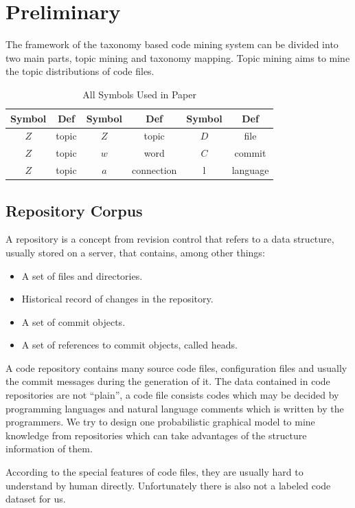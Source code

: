 \section{Preliminary}
\label{sec:framework}

The framework of the taxonomy based code mining system can be divided into two main
parts, topic mining and taxonomy mapping. Topic mining aims to mine the topic
distributions of code files.
\begin{table}[h]
\centering
\label{tab:anno}
\begin{tabular}{|c|c||c|c||c|c|}
\hline
Symbol & Def & Symbol & Def & Symbol & Def\\\hline \hline
$Z$ & topic & $Z$ & topic & $D$ & file \\\hline
$Z$ & topic & $w$ & word & $C$ & commit \\\hline
$Z$ & topic & $a$ & connection & l & language \\\hline
\end{tabular}
\caption{All Symbols Used in Paper}
\end{table}

\subsection{Repository Corpus}
\label{sec:repo}
A repository is a concept from revision control that refers to a data structure,
usually stored on a server, that contains, among other things:
\begin{itemize}
\item A set of files and directories.
\item Historical record of changes in the repository.
\item A set of commit objects.
\item A set of references to commit objects, called heads.
\end{itemize}
A code repository contains many source code files, configuration files and usually
the commit messages during the generation of it.
The data contained in code repositories are not ``plain'', a
code file consists codes which may be decided by programming
languages and natural language comments which is written by the programmers.
We try to design one probabilistic graphical model to mine knowledge from
repositories which can take advantages of the structure information of them.

According to the special features of code files, they are usually hard to understand
by human directly. Unfortunately there is also not a labeled code dataset for us. 


